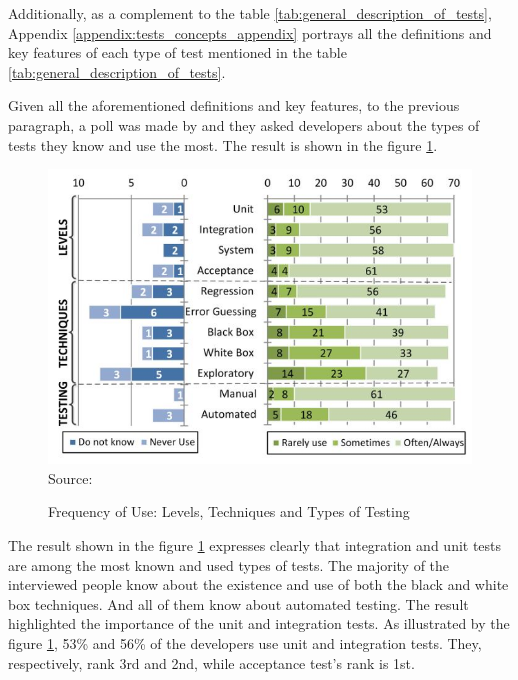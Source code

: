 Additionally, as a complement to the table \ref{tab:general_description_of_tests}, Appendix \ref{appendix:tests_concepts_appendix} portrays all the definitions and key features of each type of test mentioned in the table \ref{tab:general_description_of_tests}.

Given all the aforementioned definitions and key features, to the previous paragraph, a poll was made by \cite{sanchez2020beyond} and they asked developers about the types of tests they know and use the most. The result is shown in the figure \ref{fig:frequency_of_use_levels_techniques_and_types_of_testing}.

\begin{figure}[H]
    \centering
    \caption{Frequency of Use: Levels, Techniques and Types of Testing}
    \includegraphics[width=1\linewidth]{figures/frequency_of_use__levels_techniques_and_types_of_testing.png}
    \label{fig:frequency_of_use_levels_techniques_and_types_of_testing}
    \footnotesize Source: \cite{sanchez2020beyond}
\end{figure}

The result shown in the figure \ref{fig:frequency_of_use_levels_techniques_and_types_of_testing}
expresses clearly that integration and unit tests are among the most known and used types of tests. The majority of the interviewed people know about the existence and use of both the black and white box techniques.
And all of them know about automated testing. The result highlighted the importance of the unit and integration tests. As illustrated by the figure \ref{fig:frequency_of_use_levels_techniques_and_types_of_testing},
53\% and 56\% of the developers use unit and integration tests. They, respectively, rank 3rd and 2nd, while acceptance test's rank is 1st.

